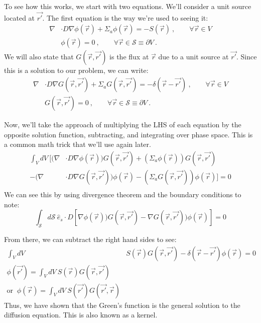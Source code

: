 \documentclass[12pt]{article}
\begin{document}
To see how this works, we start with two equations. We'll consider a unit source located at $\vec{r'}$. The first equation is the way we're used to seeing it:
\begin{align}
\nabla &\cdot D \nabla \phi(\vec{r}) + \Sigma_a \phi(\vec{r}) = -S(\vec{r}) \:, \qquad \forall \vec{r} \in V  \\
%
&\phi(\vec{r}) = 0\:, \qquad \forall \vec{r} \in \mathcal{S} \equiv \partial V\:.\ \nonumber
 \label{eq:de}
\end{align}
%
We will also state that $G(\vec{r}, \vec{r'})$ is the flux at $\vec{r}$ due to a unit source at $\vec{r'}$. Since this is a solution to our problem, we can write:
\begin{align}
\nabla &\cdot D \nabla G(\vec{r}, \vec{r'}) + \Sigma_a G(\vec{r}, \vec{r'}) = -\delta(\vec{r} - \vec{r'}) \:, \qquad \forall \vec{r} \in V  \\
%
&G(\vec{r}, \vec{r'}) = 0\:, \qquad \forall \vec{r} \in \mathcal{S} \equiv \partial V\:. \nonumber
\label{eq:green}
\end{align}

Now, we'll take the approach of multiplying the LHS of each equation by the opposite solution function, subtracting, and integrating over phase space. This is a common math trick that we'll use again later.
\begin{align*}
\int_V dV\: \bigl[(\nabla &\cdot D \nabla \phi(\vec{r}))G(\vec{r}, \vec{r'}) + (\Sigma_a \phi(\vec{r})) G(\vec{r}, \vec{r'}) \\
-(\nabla &\cdot D \nabla G(\vec{r}, \vec{r'}))\phi(\vec{r}) - (\Sigma_a G(\vec{r}, \vec{r'}))\phi(\vec{r}) \bigr] = 0\\
\end{align*}
We can see this by using divergence theorem and the boundary conditions to note:
\[\int_{\mathcal{S}} d\mathcal{S}\: \hat{e}_s \cdot D[\nabla \phi(\vec{r}))G(\vec{r}, \vec{r'}) - \nabla G(\vec{r}, \vec{r'}))\phi(\vec{r})] = 0\]

From there, we can subtract the right hand sides to see:
\begin{align*}
\int_V dV\: &S(\vec{r})G(\vec{r}, \vec{r'}) - \delta(\vec{r} - \vec{r'})\phi(\vec{r}) = 0\\%
\phi(\vec{r'}) = \int_V dV\: S(\vec{r})G(\vec{r}, \vec{r'})\\
\text{or }\: \phi(\vec{r}) = \int_V dV\: S(\vec{r'})G(\vec{r'}, \vec{r})
\end{align*}
%
Thus, we have shown that the Green's function is the general solution to the diffusion equation. This is also known as a kernel.
\end{document}
